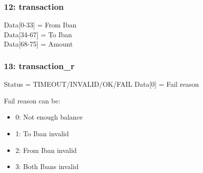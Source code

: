 \documentclass[12pt, a4paper]{article}
\begin{document}
\subsubsection{12: transaction}
Data[0-33] = From Iban\\
Data[34-67] = To Iban\\
Data[68-75] = Amount\\

\subsubsection{13: transaction\_r}
Status = TIMEOUT/INVALID/OK/FAIL
Data[0] = Fail reason

Fail reason can be:
\begin{itemize}
	\item 0: Not enough balance
	\item 1: To Iban invalid
	\item 2: From Iban invalid
	\item 3: Both Ibans invalid
\end{itemize}
\end{document}
